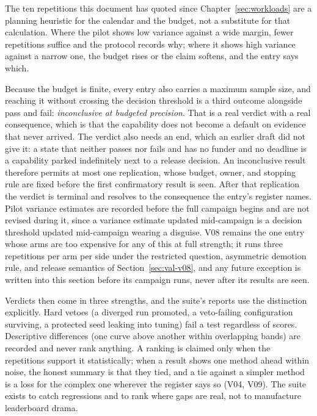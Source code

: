 The ten repetitions this document has quoted since
Chapter~\ref{sec:workloads} are a planning heuristic for the
calendar and the budget, not a substitute for that calculation.
Where the pilot shows low variance against a wide margin, fewer
repetitions suffice and the protocol records why; where it shows
high variance against a narrow one, the budget rises or the claim
softens, and the entry says which.

Because the budget is finite, every entry also carries a maximum
sample size, and reaching it without crossing the decision threshold
is a third outcome alongside pass and fail: \emph{inconclusive at
budgeted precision}. That is a real verdict with a real consequence,
which is that the capability does not become a default on evidence
that never arrived. The verdict also needs an end, which an earlier
draft did not give it: a state that neither passes nor fails and has no
funder and no deadline is a capability parked indefinitely next to a
release decision. An inconclusive result therefore permits at most one
replication, whose budget, owner, and stopping rule are fixed before the
first confirmatory result is seen. After that replication the verdict is
terminal and resolves to the consequence the entry's register names. Pilot variance estimates are recorded before the
full campaign begins and are not revised during it, since a variance
estimate updated mid-campaign is a decision threshold updated
mid-campaign wearing a disguise. V08 remains the one entry whose arms
are too expensive for any of this at full strength; it runs three
repetitions per arm per side under the restricted question,
asymmetric demotion rule, and release semantics of
Section~\ref{sec:val-v08}, and any future exception is written into
this section before its campaign runs, never after its results are
seen.

Verdicts then come in three strengths, and the suite's reports use
the distinction explicitly. Hard vetoes (a diverged run promoted, a
veto-failing configuration surviving, a protected seed leaking into
tuning) fail a test regardless of scores. Descriptive differences
(one curve above another within overlapping bands) are recorded and
never rank anything. A ranking is claimed only when the repetitions
support it statistically; when a result shows one method ahead
within noise, the honest summary is that they tied, and a tie
against a simpler method is a loss for the complex one wherever the
register says so (V04, V09). The suite exists to catch regressions
and to rank where gaps are real, not to manufacture leaderboard
drama.

